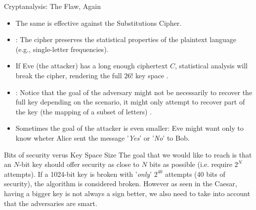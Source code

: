 \begin{parag}{Cryptanalysis: The Flaw, Again}
	\begin{itemize}
    	\item The same  is effective against the Substitutions Cipher.
    	\item {}: The cipher preserves the statistical properties of the plaintext language (e.g., single-letter frequencies).
    	\item If Eve (the attacker) has a long enough ciphertext $C$, statistical analysis will break the cipher, rendering the full $26!$ key space .
    	\item {}: Notice that the goal of the adversary might not be necessarily to recover the full key depending on the scenario, it might only attempt to recover part of the key (the mapping of a subset of letters) .
    	\item Sometimes the goal of the attacker is even smaller: Eve might want only to know wheter Alice sent the message '\textit{Yes}' or '\textit{No}' to Bob.
	\end{itemize}
\end{parag}

\begin{parag}{Bits of security verus Key Space Size}
    The goal that we would like to reach is that an $N$-bit key should offer security as close to $N$ bits as possible (i.e. require $2^{N}$ attempts). If a 1024-bit key is broken with '\textit{only}' $2^{40}$ attempts (40 bits of security), the algorithm is considered broken. However as seen in the Caesar, having a bigger key is not always a sign better, we also need to take into account that the adversaries are smart.
\end{parag}

